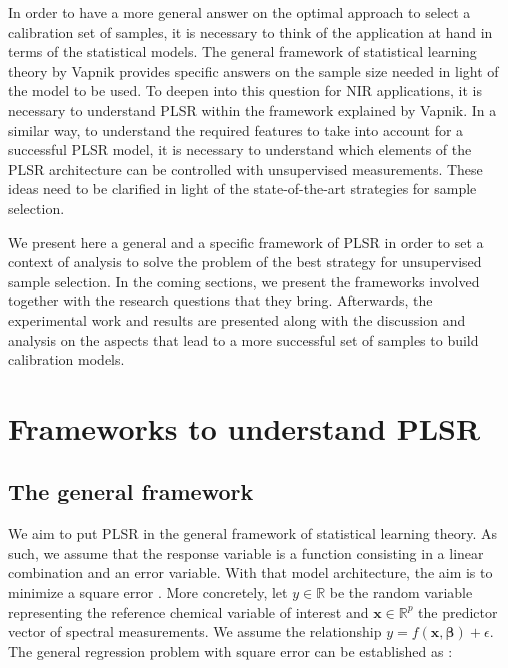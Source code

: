 \documentclass[journal=ancham,manuscript=article]{achemso}
\begin{document}
In order to have a more general answer on the optimal approach to select a calibration set of samples, it is necessary to think of the application at hand in terms of the statistical models. The general framework of statistical learning theory by Vapnik \cite{Vapnik2019, Vapnik2000} provides specific answers on the sample size needed in light of the model to be used. To deepen into this question for NIR applications, it is necessary to understand PLSR within the framework explained by Vapnik. In a similar way, to understand the required features to take into account for a successful PLSR model, it is necessary to understand which elements of the PLSR architecture can be controlled with unsupervised measurements. These ideas need to be clarified in light of the state-of-the-art strategies for sample selection.

We present here a general and a specific framework of PLSR in order to set a context of analysis to solve the problem of the best strategy for unsupervised sample selection. In the coming sections, we present the frameworks involved together with the research questions that they bring. Afterwards, the experimental work and results are presented along with the discussion and analysis on the aspects that lead to a more successful set of samples to build calibration models.


\section*{Frameworks to understand PLSR}

\subsection*{The general framework}

We aim to put PLSR in the general framework of statistical learning theory. As such, we assume that the response variable is a function consisting in a linear combination and an error variable. With that model architecture, the aim is to minimize a square error \cite{Vapnik2019}. More concretely, let $y \in \mathbb{R}$ be the random variable representing the reference chemical variable of interest and   $\mathbf{x} \in \mathbb{R}^{p}$ the predictor vector of spectral measurements. We assume the relationship $ y = f(\mathbf{x}, \boldsymbol{\beta}) + \epsilon$.  The general regression problem with square error can be established as \cite{Vapnik2000}:
\end{document}
